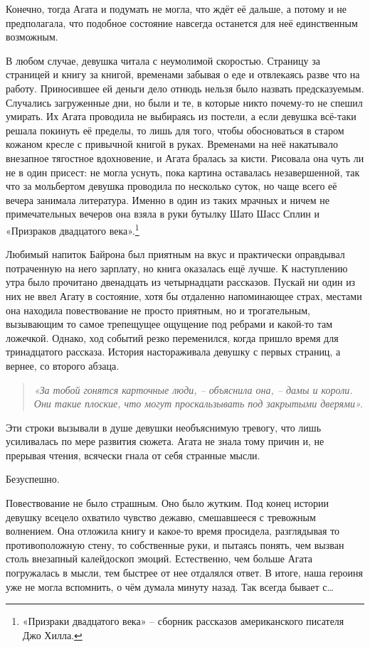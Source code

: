 \documentclass[
  a5paperpaper,
  DIV=11,
  numbers=noendperiod]{scrreprt}
\begin{document}
Конечно, тогда Агата и подумать не могла, что ждёт её дальше, а потому и
не предполагала, что подобное состояние навсегда останется для неё
единственным возможным.

В любом случае, девушка читала с неумолимой скоростью. Страницу за
страницей и книгу за книгой, временами забывая о еде и отвлекаясь разве
что на работу. Приносившее ей деньги дело отнюдь нельзя было назвать
предсказуемым. Случались загруженные дни, но были и те, в которые никто
почему-то не спешил умирать. Их Агата проводила не выбираясь из постели,
а если девушка всё-таки решала покинуть её пределы, то лишь для того,
чтобы обосноваться в старом кожаном кресле с привычной книгой в руках.
Временами на неё накатывало внезапное тягостное вдохновение, и Агата
бралась за кисти. Рисовала она чуть ли не в один присест: не могла
уснуть, пока картина оставалась незавершенной, так что за мольбертом
девушка проводила по несколько суток, но чаще всего её вечера занимала
литература. Именно в один из таких мрачных и ничем не примечательных
вечеров она взяла в руки бутылку Шато Шасс Сплин и «Призраков двадцатого
века».\footnote{«Призраки двадцатого века» -- сборник рассказов
  американского писателя Джо Хилла.}

Любимый напиток Байрона был приятным на вкус и практически оправдывал
потраченную на него зарплату, но книга оказалась ещё лучше. К
наступлению утра было прочитано двенадцать из четырнадцати рассказов.
Пускай ни один из них не ввел Агату в состояние, хотя бы отдаленно
напоминающее страх, местами она находила повествование не просто
приятным, но и трогательным, вызывающим то самое трепещущее ощущение под
ребрами и какой-то там ложечкой. Однако, ход событий резко переменился,
когда пришло время для тринадцатого рассказа. История настораживала
девушку с первых страниц, а вернее, со второго абзаца.

\begin{quote}
\emph{«За тобой гонятся карточные люди, -- объяснила она, -- дамы и
короли. Они такие плоские, что могут проскальзывать под закрытыми
дверями».}
\end{quote}

Эти строки вызывали в душе девушки необъяснимую тревогу, что лишь
усиливалась по мере развития сюжета. Агата не знала тому причин и, не
прерывая чтения, всячески гнала от себя странные мысли.

Безуспешно.

Повествование не было страшным. Оно было жутким. Под конец истории
девушку всецело охватило чувство дежавю, смешавшееся с тревожным
волнением. Она отложила книгу и какое-то время просидела, разглядывая то
противоположную стену, то собственные руки, и пытаясь понять, чем вызван
столь внезапный калейдоскоп эмоций. Естественно, чем больше Агата
погружалась в мысли, тем быстрее от нее отдалялся ответ. В итоге, наша
героиня уже не могла вспомнить, о чём думала минуту назад. Так всегда
бывает с\ldots{}
\end{document}
